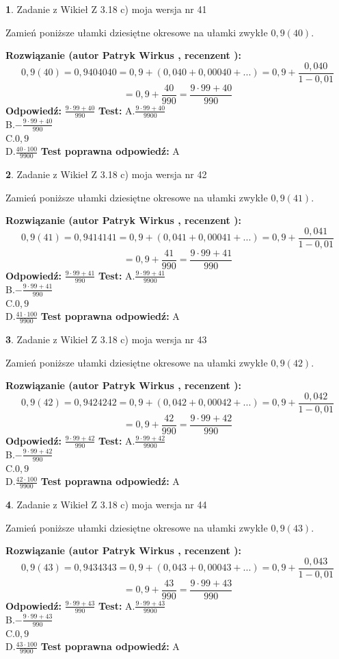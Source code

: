\documentclass[12pt, a4paper]{article}
\theoremstyle{definition} %
\newtheorem{zad}{}
\newcommand{\zadStart}[1]{\begin{zad}#1\newline}
\newcommand{\zadStop}{\end{zad}}
\newcommand{\rozwStart}[2]{\noindent \textbf{Rozwiązanie (autor #1 , recenzent #2): }\newline}
\newcommand{\rozwStop}{\newline}
\newcommand{\odpStart}{\noindent \textbf{Odpowiedź:}\newline}
\newcommand{\odpStop}{\newline}
\newcommand{\testStart}{\noindent \textbf{Test:}\newline}
\newcommand{\testStop}{\newline}
\newcommand{\kluczStart}{\noindent \textbf{Test poprawna odpowiedź:}\newline}
\newcommand{\kluczStop}{\newline}
\begin{document}
\zadStart{Zadanie z Wikieł Z 3.18 c) moja wersja nr 41}

Zamień poniższe ułamki dziesiętne okresowe na ułamki zwykłe $0,9(40)$.
\zadStop
\rozwStart{Patryk Wirkus}{}
$$0,9(40)=0,9404040=0,9+(0,040+0,00040+...)=0,9+\frac{0,040}{1-0,01}$$
$$=0,9+\frac{40}{990}=\frac{9\cdot99+40}{990}$$
\rozwStop
\odpStart
$\frac{9\cdot99+40}{990}$
\odpStop
\testStart
A.$\frac{9\cdot99+40}{9900}$\\ B.$-\frac{9\cdot99+40}{990}$\\ C.$0,9$\\ D.$\frac{40\cdot100}{9900}$
\testStop
\kluczStart
A
\kluczStop



\zadStart{Zadanie z Wikieł Z 3.18 c) moja wersja nr 42}

Zamień poniższe ułamki dziesiętne okresowe na ułamki zwykłe $0,9(41)$.
\zadStop
\rozwStart{Patryk Wirkus}{}
$$0,9(41)=0,9414141=0,9+(0,041+0,00041+...)=0,9+\frac{0,041}{1-0,01}$$
$$=0,9+\frac{41}{990}=\frac{9\cdot99+41}{990}$$
\rozwStop
\odpStart
$\frac{9\cdot99+41}{990}$
\odpStop
\testStart
A.$\frac{9\cdot99+41}{9900}$\\ B.$-\frac{9\cdot99+41}{990}$\\ C.$0,9$\\ D.$\frac{41\cdot100}{9900}$
\testStop
\kluczStart
A
\kluczStop



\zadStart{Zadanie z Wikieł Z 3.18 c) moja wersja nr 43}

Zamień poniższe ułamki dziesiętne okresowe na ułamki zwykłe $0,9(42)$.
\zadStop
\rozwStart{Patryk Wirkus}{}
$$0,9(42)=0,9424242=0,9+(0,042+0,00042+...)=0,9+\frac{0,042}{1-0,01}$$
$$=0,9+\frac{42}{990}=\frac{9\cdot99+42}{990}$$
\rozwStop
\odpStart
$\frac{9\cdot99+42}{990}$
\odpStop
\testStart
A.$\frac{9\cdot99+42}{9900}$\\ B.$-\frac{9\cdot99+42}{990}$\\ C.$0,9$\\ D.$\frac{42\cdot100}{9900}$
\testStop
\kluczStart
A
\kluczStop



\zadStart{Zadanie z Wikieł Z 3.18 c) moja wersja nr 44}

Zamień poniższe ułamki dziesiętne okresowe na ułamki zwykłe $0,9(43)$.
\zadStop
\rozwStart{Patryk Wirkus}{}
$$0,9(43)=0,9434343=0,9+(0,043+0,00043+...)=0,9+\frac{0,043}{1-0,01}$$
$$=0,9+\frac{43}{990}=\frac{9\cdot99+43}{990}$$
\rozwStop
\odpStart
$\frac{9\cdot99+43}{990}$
\odpStop
\testStart
A.$\frac{9\cdot99+43}{9900}$\\ B.$-\frac{9\cdot99+43}{990}$\\ C.$0,9$\\ D.$\frac{43\cdot100}{9900}$
\testStop
\kluczStart
A
\kluczStop
\end{document}
